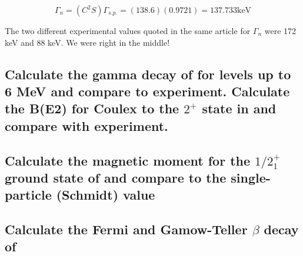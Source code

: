 \documentclass[12pt]{article}
\begin{document}
\begin{equation}
\Gamma_n=(C^2S)\Gamma_{s.p.}=(138.6)(0.9721)=137.733 \text{keV}
\end{equation}

The two different experimental values quoted in the same article for $\Gamma_n$ were 172 keV and 88 keV. We were right in the middle!




	\subsection{Calculate the gamma decay of  for levels up to 6 MeV and compare to experiment. Calculate the B(E2) for Coulex to the $2^+$ state in  and compare with experiment.}

	\subsection{Calculate the magnetic moment for the $1/2^+_1$ ground state of  and compare to the single-particle (Schmidt) value}
	
	\subsection{Calculate the Fermi and Gamow-Teller $\beta$ decay of }
\end{document}
